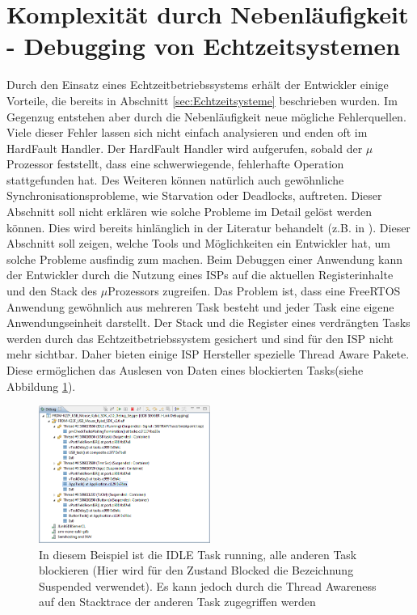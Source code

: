 \section{Komplexität durch Nebenläufigkeit - Debugging von Echtzeitsystemen} 
\label{sec:Debugging von Echtzeitsystemen}
Durch den Einsatz eines Echtzeitbetriebssystems erhält der Entwickler einige Vorteile, die bereits in Abschnitt \ref{sec:Echtzeitsysteme} beschrieben wurden. Im Gegenzug entstehen aber durch die Nebenläufigkeit neue mögliche Fehlerquellen. Viele dieser Fehler lassen sich nicht einfach analysieren und enden oft im HardFault Handler. Der HardFault Handler wird aufgerufen, sobald der $\mu$Prozessor feststellt, dass eine schwerwiegende, fehlerhafte Operation stattgefunden hat. Des Weiteren können na\-tür\-lich auch gewöhnliche Synchronisationsprobleme, wie Starvation oder Deadlocks, auftreten. Dieser Abschnitt soll nicht erklären wie solche Probleme im Detail gelöst werden können. Dies wird bereits hin\-läng\-lich in der Literatur behandelt (z.B. in \cite{9783827373427} \cite{9783864902222}). Dieser Abschnitt soll zeigen, welche Tools und Möglichkeiten ein Entwickler hat, um solche Probleme ausfindig zum machen. Beim Debuggen einer Anwendung kann der Entwickler durch die Nutzung eines ISPs auf die aktuellen Registerinhalte und den Stack des $\mu$Prozessors zugreifen. 
Das Problem ist, dass eine FreeRTOS Anwendung ge\-wöhn\-lich aus mehreren Task besteht und jeder Task eine eigene Anwendungseinheit darstellt. Der Stack und die Register eines verdrängten Tasks werden durch das Echtzeitbetriebssystem gesichert und sind für den ISP nicht mehr sichtbar. Daher bieten einige ISP Hersteller spezielle Thread Aware Pakete. Diese ermöglichen das Auslesen von Daten eines blockierten Tasks(siehe Abbildung \ref{fig:ThreadAware}).
\begin{figure}[hbt]
	\centering
		\includegraphics[width=0.5\textwidth]{Pictures/Segger/freertosThreadAwareness}
	\caption{In diesem Beispiel ist die IDLE Task running, alle anderen Task blockieren (Hier wird für den Zustand Blocked die Bezeichnung Suspended verwendet). Es kann jedoch durch die Thread Awareness auf den Stacktrace der anderen Task zugegriffen werden }
	\label{fig:ThreadAware}
\end{figure}
